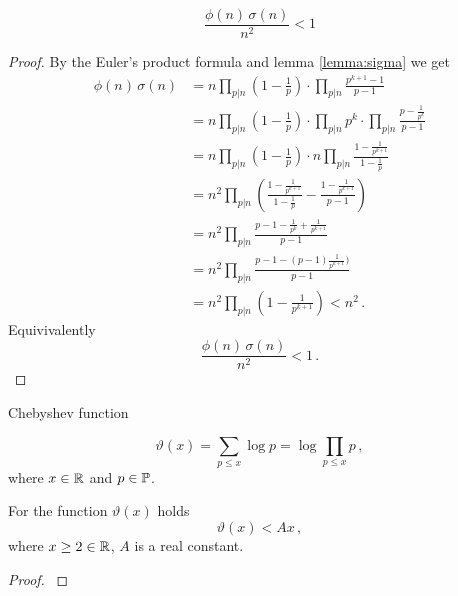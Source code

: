 \documentclass{article}
\begin{document}
\begin{lemma}
\label{thm:sigmafii}
\cite{HW:phisigma}
\begin{equation*}
    \frac{\phi(n)\,\sigma(n)}{n^2}<1
\end{equation*}

\begin{proof}
By the Euler's product formula and lemma \ref{lemma:sigma} we get
\begin{align*}
    \phi(n)\,\sigma(n) & = n\prod_{p\vert n}\left(1-\frac{1}{p}\right) \cdot \prod_{p\vert n} \frac{p^{k+1}-1}{p-1}\\
    & = n\prod_{p\vert n}\left(1-\frac{1}{p}\right) \cdot \prod_{p\vert n} p^k \cdot \prod_{p\vert n} \frac{p-\frac{1}{p^k}}{p-1}\\
    & = n\prod_{p\vert n}\left(1-\frac{1}{p}\right) \cdot n \prod_{p\vert n}\frac{1-\frac{1}{p^{k+1}}}{1-\frac{1}{p}}\\
    & = n^2 \prod_{p\vert n} \left( \frac{1-\frac{1}{p^{k+1}}}{1-\frac{1}{p}} - \frac{1-\frac{1}{p^{k+1}}}{p-1}\right)\\
    & = n^2 \prod_{p\vert n} \frac{p-1-\frac{1}{p^k}+\frac{1}{p^{k+1}}}{p-1}\\
    & = n^2 \prod_{p\vert n} \frac{p-1-(p-1)\frac{1}{p^{k+1}})}{p-1}\\
    & = n^2 \prod_{p\vert n} \left(1-\frac{1}{p^{k+1}}\right) < n^2\,.
\end{align*}
Equivivalently
\begin{equation*}
    \frac{\phi(n)\,\sigma(n)}{n^2}<1\,.
\end{equation*}
\end{proof}
\end{lemma}


\begin{definition}
Chebyshev function \cite{HW:vartheta}

\begin{equation*}
    \vartheta(x)=\sum_{p\leq x} \log p = \log \prod_{p\leq x} p\,,
\end{equation*}
where $x\in\mathbb{R}$ and $p\in\mathbb{P}$.

\end{definition}

\begin{lemma}
\label{lemma:vartheta}
For the function $\vartheta(x)$ holds
\begin{equation*}
    \vartheta(x) < Ax\,,
\end{equation*}
where $x\geq2\in\mathbb{R}$, $A$ is a real constant.

\begin{proof}
\cite{HW:vartheta}
\end{proof}
\end{lemma}
\end{document}
